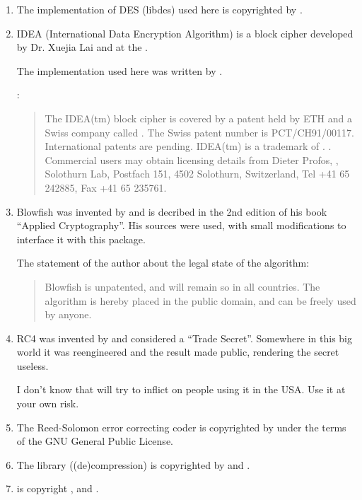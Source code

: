 \documentclass {report}
\begin{document}
\begin {enumerate}
\item	The implementation of DES (libdes) used here is copyrighted by
	\eay.

\item	IDEA (International Data Encryption Algorithm) is a block
	cipher developed  by  Dr. Xuejia Lai  and \massey{} at the \sfit{}.

	The implementation used here was written by \demoliner.

	:
	\begin {quotation}
		The IDEA(tm) block cipher is covered by a patent held
		by ETH and a Swiss company called \ascom{}.  The
		Swiss patent number is PCT/CH91/00117.  International
		patents are pending. IDEA(tm) is a trademark of
		\ascom{}.  .  Commercial users may obtain
		licensing details from Dieter Profos, \ascom{},
		Solothurn Lab, Postfach 151, 4502 Solothurn,
		Switzerland, Tel +41 65 242885, Fax +41 65 235761. 
	\end {quotation}

\item	Blowfish was invented by \schneier{} and is decribed in the
	2nd edition of his book ``Applied Cryptography''. His sources
	were used, with small modifications to interface it with this
	package.

	The statement of the author about the legal state of the
	algorithm:

	\begin {quotation}
		Blowfish is unpatented, and will remain so in all
		countries. The algorithm is hereby placed in the
		public domain, and can be freely used by anyone.
	\end {quotation}

\item	RC4 was invented by \rsadsi{} and considered a ``Trade
	Secret''. Somewhere in this big world it was reengineered and
	the result made public, rendering the secret useless.

	I don't know that \rsadsi{} will try to inflict on people using
	it in the USA. Use it at your own risk.

\item	The Reed-Solomon error correcting coder is copyrighted by
	\paulf{} under the terms of the GNU General Public License.

\item	The library \zlib{} ((de)compression) is copyrighted by
	\jlgailly{} and \madler.

\item	\rmd{} is copyright \dobbertin{}, \bosselaers{} and \preneel{}.
\end   {enumerate}
\end{document}

